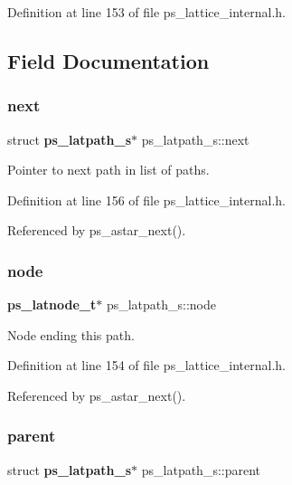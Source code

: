 Definition at line 153 of file ps\+\_\+lattice\+\_\+internal.\+h.



\subsection{Field Documentation}
\mbox{\label{structps__latpath__s_a614ad4a857fb07f76959d385abf50a6d}} 
\subsubsection{next}
{\footnotesize\ttfamily struct \textbf{ ps\+\_\+latpath\+\_\+s}$\ast$ ps\+\_\+latpath\+\_\+s\+::next}



Pointer to next path in list of paths. 



Definition at line 156 of file ps\+\_\+lattice\+\_\+internal.\+h.



Referenced by ps\+\_\+astar\+\_\+next().

\mbox{\label{structps__latpath__s_a9672f7a5002d994985039aece2a69250}} 
\subsubsection{node}
{\footnotesize\ttfamily \textbf{ ps\+\_\+latnode\+\_\+t}$\ast$ ps\+\_\+latpath\+\_\+s\+::node}



Node ending this path. 



Definition at line 154 of file ps\+\_\+lattice\+\_\+internal.\+h.



Referenced by ps\+\_\+astar\+\_\+next().

\mbox{\label{structps__latpath__s_a87acd26322fca11aa1432cdf9d1a2128}} 
\subsubsection{parent}
{\footnotesize\ttfamily struct \textbf{ ps\+\_\+latpath\+\_\+s}$\ast$ ps\+\_\+latpath\+\_\+s\+::parent}



